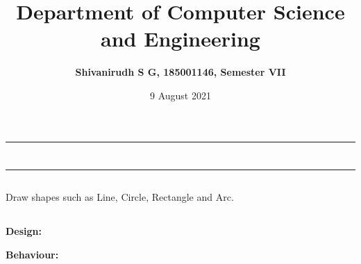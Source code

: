 \documentclass[12pt,letterpaper]{article}
\title{\textbf{Department of Computer Science and Engineering}}
\author{\textbf{Shivanirudh S G, 185001146, Semester VII }}
\date{9 August 2021}
\begin{document}
\maketitle
\hrule
\section*{}
\hrule 
\bigskip\bigskip

\subsection*{}

\subsection*{}
\begin{flushleft}
    Draw shapes such as Line, Circle, Rectangle and Arc.  
\end{flushleft}

\subsection*{}
\subsubsection*{}
\textbf{Design:}
\begin{flushleft}

\end{flushleft}
\textbf{Behaviour:}
\begin{flushleft}

\end{flushleft}

\newpage
\end{document}
